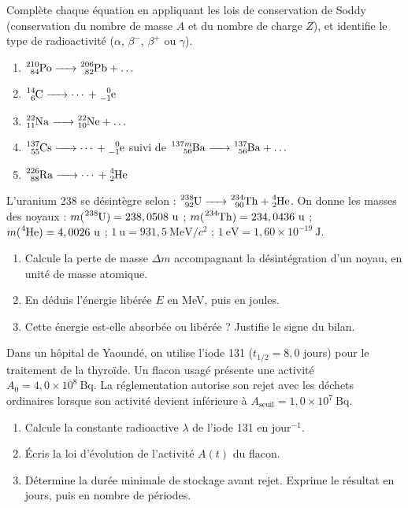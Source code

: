 \documentclass[11pt]{article}
\newcounter{popsec}
\newcounter{popsub}
\newcommand{\courssub}[1]{%
  \stepcounter{popsub}%
  \par\vspace{9pt}\noindent{\popxbold\fontsize{11.5}{13}\selectfont\color{popink}{\color{poporange}\thepopsec.\thepopsub}\hspace{6pt}#1}\par\nopagebreak\vspace{4pt}
}
\begin{document}
\courssub{Je m'entraîne}

\begin{exercice}
Complète chaque équation en appliquant les lois de conservation de Soddy (conservation du nombre de masse $A$ et du nombre de charge $Z$), et identifie le type de radioactivité ($\alpha$, $\beta^-$, $\beta^+$ ou $\gamma$).
\begin{enumerate}
\item $\ce{^{210}_{84}Po -> ^{206}_{82}Pb} + \ldots$
\item $\ce{^{14}_{6}C -> $\cdots$ + ^{0}_{-1}e}$
\item $\ce{^{22}_{11}Na -> ^{22}_{10}Ne} + \ldots$
\item $\ce{^{137}_{55}Cs -> $\cdots$ + ^{0}_{-1}e}$ suivi de $\ce{^{137m}_{56}Ba -> ^{137}_{56}Ba} + \ldots$
\item $\ce{^{226}_{88}Ra -> $\cdots$ + ^{4}_{2}He}$
\end{enumerate}
\end{exercice}

\begin{exercice}
L'uranium 238 se désintègre selon : $\ce{^{238}_{92}U -> ^{234}_{90}Th + ^{4}_{2}He}$.
On donne les masses des noyaux : $m(\ce{^{238}U}) = 238,0508\ \mathrm{u}$ ; $m(\ce{^{234}Th}) = 234,0436\ \mathrm{u}$ ; $m(\ce{^{4}He}) = 4,0026\ \mathrm{u}$ ; $1\ \mathrm{u} = 931,5\ \mathrm{MeV}/c^{2}$ ; $1\ \mathrm{eV} = 1,60\times 10^{-19}\ \mathrm{J}$.
\begin{enumerate}
\item Calcule la perte de masse $\Delta m$ accompagnant la désintégration d'un noyau, en unité de masse atomique.
\item En déduis l'énergie libérée $E$ en MeV, puis en joules.
\item Cette énergie est-elle absorbée ou libérée ? Justifie le signe du bilan.
\end{enumerate}
\end{exercice}

\begin{exercice}
Dans un hôpital de Yaoundé, on utilise l'iode 131 ($t_{1/2} = 8,0$ jours) pour le traitement de la thyroïde. Un flacon usagé présente une activité $A_0 = 4,0\times 10^{8}\ \mathrm{Bq}$. La réglementation autorise son rejet avec les déchets ordinaires lorsque son activité devient inférieure à $A_{\mathrm{seuil}} = 1,0\times 10^{7}\ \mathrm{Bq}$.
\begin{enumerate}
\item Calcule la constante radioactive $\lambda$ de l'iode 131 en $\mathrm{jour^{-1}}$.
\item Écris la loi d'évolution de l'activité $A(t)$ du flacon.
\item Détermine la durée minimale de stockage avant rejet. Exprime le résultat en jours, puis en nombre de périodes.
\end{enumerate}
\end{exercice}
\end{document}
